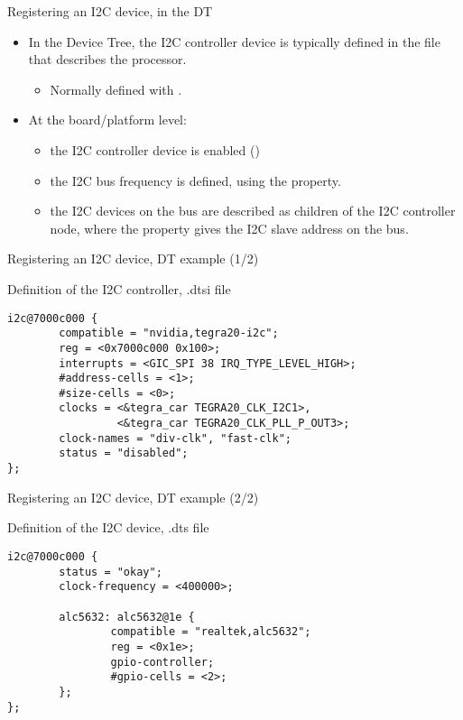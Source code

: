 \begin{frame}{Registering an I2C device, in the DT}
  \begin{itemize}
  \item In the Device Tree, the I2C controller device is typically
    defined in the  file that describes the processor.
    \begin{itemize}
    \item Normally defined with .
    \end{itemize}
  \item At the board/platform level:
    \begin{itemize}
    \item the I2C controller device is enabled
      ()
    \item the I2C bus frequency is defined, using the
       property.
    \item the I2C devices on the bus are described as children of the
      I2C controller node, where the  property gives the I2C
      slave address on the bus.
    \end{itemize}
  \end{itemize}
\end{frame}

\begin{frame}[fragile]{Registering an I2C device, DT example (1/2)}
  \begin{block}{Definition of the I2C controller, .dtsi file}
    \begin{verbatim}
i2c@7000c000 {
        compatible = "nvidia,tegra20-i2c";
        reg = <0x7000c000 0x100>;
        interrupts = <GIC_SPI 38 IRQ_TYPE_LEVEL_HIGH>;
        #address-cells = <1>;
        #size-cells = <0>;
        clocks = <&tegra_car TEGRA20_CLK_I2C1>,
                 <&tegra_car TEGRA20_CLK_PLL_P_OUT3>;
        clock-names = "div-clk", "fast-clk";
        status = "disabled";
};
    \end{verbatim}
  \end{block}
\end{frame}

\begin{frame}[fragile]{Registering an I2C device, DT example (2/2)}
  \begin{block}{Definition of the I2C device, .dts file}
    \begin{verbatim}
i2c@7000c000 {
        status = "okay";
        clock-frequency = <400000>;

        alc5632: alc5632@1e {
                compatible = "realtek,alc5632";
                reg = <0x1e>;
                gpio-controller;
                #gpio-cells = <2>;
        };
};
    \end{verbatim}
  \end{block}
\end{frame}

